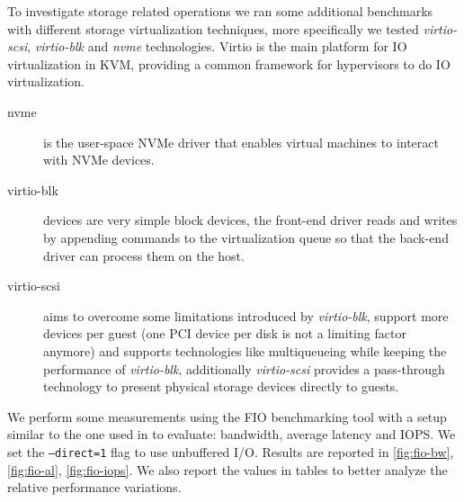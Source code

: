 \documentclass[twocolumn]{article}
\begin{document}
To investigate storage related operations we ran some additional benchmarks with different storage virtualization techniques, more specifically we tested \textit{virtio-scsi}, \textit{virtio-blk} and \textit{nvme} technologies. Virtio is the main platform for IO virtualization in KVM, providing a common framework for hypervisors to do IO virtualization.

\begin{description}
    \item[nvme] is the user-space NVMe driver that enables virtual machines to interact with NVMe devices.
    \item[virtio-blk] devices are very simple block devices, the front-end driver reads and writes by appending commands to the virtualization queue so that the back-end driver can process them on the host.
    \item[virtio-scsi] aims to overcome some limitations introduced by \textit{virtio-blk}, support more devices per guest (one PCI device per disk is not a limiting factor anymore) and supports technologies like multiqueueing while keeping the performance of \textit{virtio-blk}, additionally \textit{virtio-scsi} provides a pass-through technology to present physical storage devices directly to guests.\cite{scsi}
\end{description}

We perform some measurements using the FIO \cite{fio} benchmarking tool with a setup similar to the one used in \cite{spool} to evaluate: bandwidth, average latency and IOPS. We set the \texttt{--direct=1} flag to use unbuffered I/O. Results are reported in \ref{fig:fio-bw}, \ref{fig:fio-al}, \ref{fig:fio-iops}. We also report the values in tables to better analyze the relative performance variations.
\end{document}

